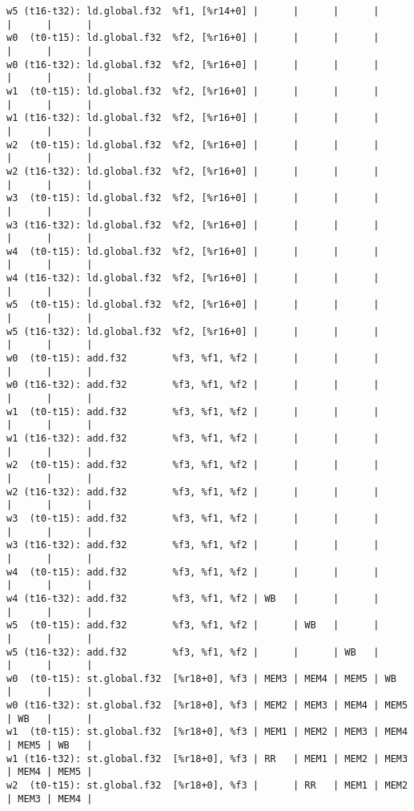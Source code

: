 \documentclass[11pt]{article}
\begin{document}
\begin{Answer}
\begin{verbatim}
w5 (t16-t32): ld.global.f32  %f1, [%r14+0] |      |      |      |      |      |      |
w0  (t0-t15): ld.global.f32  %f2, [%r16+0] |      |      |      |      |      |      |
w0 (t16-t32): ld.global.f32  %f2, [%r16+0] |      |      |      |      |      |      |
w1  (t0-t15): ld.global.f32  %f2, [%r16+0] |      |      |      |      |      |      |
w1 (t16-t32): ld.global.f32  %f2, [%r16+0] |      |      |      |      |      |      |
w2  (t0-t15): ld.global.f32  %f2, [%r16+0] |      |      |      |      |      |      |
w2 (t16-t32): ld.global.f32  %f2, [%r16+0] |      |      |      |      |      |      |
w3  (t0-t15): ld.global.f32  %f2, [%r16+0] |      |      |      |      |      |      |
w3 (t16-t32): ld.global.f32  %f2, [%r16+0] |      |      |      |      |      |      |
w4  (t0-t15): ld.global.f32  %f2, [%r16+0] |      |      |      |      |      |      |
w4 (t16-t32): ld.global.f32  %f2, [%r16+0] |      |      |      |      |      |      |
w5  (t0-t15): ld.global.f32  %f2, [%r16+0] |      |      |      |      |      |      |
w5 (t16-t32): ld.global.f32  %f2, [%r16+0] |      |      |      |      |      |      |
w0  (t0-t15): add.f32        %f3, %f1, %f2 |      |      |      |      |      |      |
w0 (t16-t32): add.f32        %f3, %f1, %f2 |      |      |      |      |      |      |
w1  (t0-t15): add.f32        %f3, %f1, %f2 |      |      |      |      |      |      |
w1 (t16-t32): add.f32        %f3, %f1, %f2 |      |      |      |      |      |      |
w2  (t0-t15): add.f32        %f3, %f1, %f2 |      |      |      |      |      |      |
w2 (t16-t32): add.f32        %f3, %f1, %f2 |      |      |      |      |      |      |
w3  (t0-t15): add.f32        %f3, %f1, %f2 |      |      |      |      |      |      |
w3 (t16-t32): add.f32        %f3, %f1, %f2 |      |      |      |      |      |      |
w4  (t0-t15): add.f32        %f3, %f1, %f2 |      |      |      |      |      |      |
w4 (t16-t32): add.f32        %f3, %f1, %f2 | WB   |      |      |      |      |      |
w5  (t0-t15): add.f32        %f3, %f1, %f2 |      | WB   |      |      |      |      |
w5 (t16-t32): add.f32        %f3, %f1, %f2 |      |      | WB   |      |      |      |
w0  (t0-t15): st.global.f32  [%r18+0], %f3 | MEM3 | MEM4 | MEM5 | WB   |      |      |
w0 (t16-t32): st.global.f32  [%r18+0], %f3 | MEM2 | MEM3 | MEM4 | MEM5 | WB   |      |
w1  (t0-t15): st.global.f32  [%r18+0], %f3 | MEM1 | MEM2 | MEM3 | MEM4 | MEM5 | WB   |
w1 (t16-t32): st.global.f32  [%r18+0], %f3 | RR   | MEM1 | MEM2 | MEM3 | MEM4 | MEM5 |
w2  (t0-t15): st.global.f32  [%r18+0], %f3 |      | RR   | MEM1 | MEM2 | MEM3 | MEM4 |

\end{verbatim}
\end{Answer}
\end{document}
